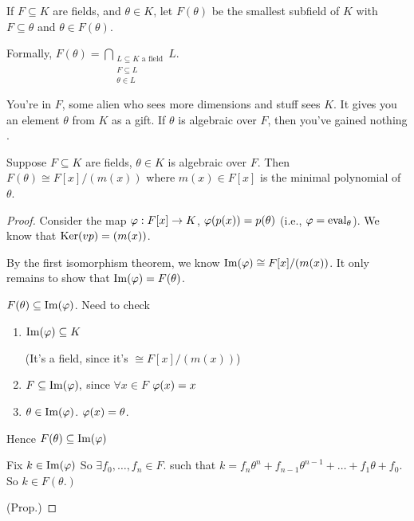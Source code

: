 \documentclass[notes.tex]{subfiles}
\begin{document}

\begin{defn}
	If $F\subseteq K$ are fields, and $\theta\in K$, let $F(\theta)$ be the smallest subfield of $K$ with $F\subseteq\theta$ and $\theta\in F(\theta)$.

	Formally, $F(\theta) = \bigcap_{\substack{L\subseteq K\text{ a field}\\F\subseteq L\\\theta\in L}} L$.
\end{defn}

\begin{quote}
	
\end{quote}

You're in $F$, some alien who sees more dimensions and stuff sees $K$. It gives you an element $\theta$ from $K$ as a gift. If $\theta$ is algebraic over $F$, then you've gained nothing \frownie.

\begin{proposition}
	Suppose $F\subseteq K$ are fields, $\theta\in K$ is algebraic over $F$. 
	Then $F(\theta)\cong F[x]/(m(x))$ where $m(x)\in F[x]$ is the minimal polynomial of $\theta$.
\end{proposition}
\begin{proof}
	Consider the map $\varphi:F[x]\to K$, $\varphi(p(x)) = p(\theta)$ (i.e., $\varphi = \mathrm{eval}_\theta$). We know that $\operatorname{\mathrm{Ker}}(vp) = (m(x))$.

	By the first isomorphism theorem, we know $\operatorname{\mathrm{Im}}(\varphi)\cong F[x]/(m(x))$.
	It only remains to show that $\operatorname{\mathrm{Im}}(\varphi) = F(\theta)$.
	\begin{claim}[1]
		$F(\theta)\subseteq \operatorname{\mathrm{Im}}(\varphi)$.
		Need to check 
		\begin{enumerate}
			\item $\operatorname{\mathrm{Im}}(\varphi)\subseteq K$ \checkmark 

			(It's a field, since it's $\cong F[x]/(m(x))$)
			\item $F\subseteq \operatorname{\mathrm{Im}}(\varphi),$ since $\forall x\in F$
			$\varphi(x) = x$
			\item $\theta\in \operatorname{\mathrm{Im}}(\varphi)$. $\varphi(x) = \theta$.
		\end{enumerate}

		Hence $F(\theta)\subseteq \operatorname{\mathrm{Im}}(\varphi)$
	\end{claim}
	\begin{claim}[2]
		Fix $k\in \operatorname{\mathrm{Im}}(\varphi)$ So $\exists f_0, \ldots, f_n\in F$.
		such that $k = f_n\theta^n + f_{n-1}\theta^{n-1} + \ldots + f_1\theta+f_0$. So $k\in F(\theta.)$
	\end{claim}
	\qedhere(Prop.)
\end{proof}
\end{document}
